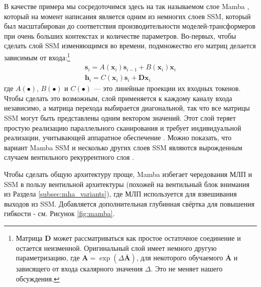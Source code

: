 В качестве примера мы сосредоточимся здесь на так называемом слое Mamba \cite{gu2023mamba}, который на момент написания является одним из немногих слоев SSM, который был масштабирован до соответствия производительности моделей-трансформеров при очень больших контекстах и количестве параметров. Во-первых, чтобы сделать слой SSM изменяющимся во времени, подмножество его матриц делается зависимым от входа:\footnote{Матрица $\mathbf{D}$ может рассматриваться как простое остаточное соединение и остается неизменной. Оригинальный слой имеет немного другую параметризацию, где $\mathbf{A} = \exp(\Delta \bar{\mathbf{A}})$, для некоторого обучаемого $\bar{\mathbf{A}}$ и зависящего от входа скалярного значения $\Delta$. Это не меняет нашего обсуждения.}
%
\begin{gather}
\mathbf{s}_i = A(\mathbf{x}_i)\mathbf{s}_{i-1} + B(\mathbf{x}_i)\mathbf{x}_i \\ \mathbf{h}_i = C(\mathbf{x}_i)\mathbf{s}_i + \mathbf{D}\mathbf{x}_i 
\end{gather}
%
где $A(\bullet)$, $B(\bullet)$ и $C(\bullet)$ — это линейные проекции их входных токенов. Чтобы сделать это возможным, слой применяется к каждому каналу входа независимо, а матрица перехода выбирается диагональной, так что все матрицы SSM могут быть представлены одним вектором значений. Этот слой теряет простую реализацию параллельного сканирования и требует индивидуальной реализации, учитывающей аппаратное обеспечение \cite{gu2023mamba}. Можно показать, что вариант Mamba SSM и несколько других слоев SSM являются вырожденным случаем вентильного рекуррентного слоя \cite{gu2021combining,gu2023mamba}.

Чтобы сделать общую архитектуру проще, Mamba избегает чередования МЛП и SSM в пользу вентильной архитектуры (похожей на вентильный блок внимания из Раздела \ref{subsec:mha_variants}), где МЛП используется для взвешивания выходов из SSM. Добавляется дополнительная глубинная свёртка для повышения гибкости - см. Рисунок \ref{fig:mamba}.